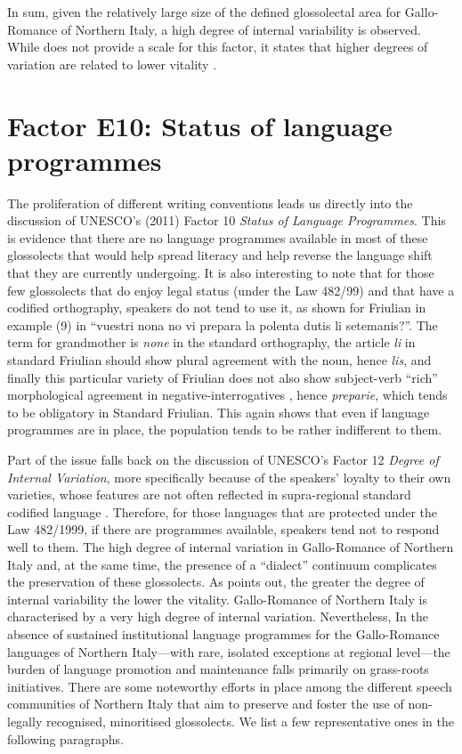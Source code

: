 \documentclass[a4paper,11pt]{article}
\begin{document}
In sum, given the relatively large size of the defined glossolectal area for Gallo-Romance of Northern Italy, a high degree of internal variability is observed. While \citet{unesco2011} does not provide a scale for this factor, it states that higher degrees of variation are related to lower vitality \cite{abtahian2017}.

\section{Factor E10: Status of language programmes}

The proliferation of different writing conventions leads us directly into the discussion of UNESCO’s (2011) Factor 10 \textit{Status of Language Programmes}. This is evidence that there are no language programmes available in most of these glossolects that would help spread literacy and help reverse the language shift that they are currently undergoing. It is also interesting to note that for those few glossolects that do enjoy legal status (under the Law 482/99) and that have a codified orthography, speakers do not tend to use it, as shown for Friulian in example (9) in  ``vuestri nona no vi prepara la polenta dutis li setemanis?''. The term for grandmother is \textit{none} in the standard orthography, the article \textit{li} in standard Friulian should show plural agreement with the noun, hence \textit{lis}, and finally this particular variety of Friulian does not also show subject-verb ``rich'' morphological agreement in negative-interrogatives \citep[see][]{poletto2016subject}, hence \textit{preparie}, which tends to be obligatory in Standard Friulian. This again shows that even if language programmes are in place, the population tends to be rather indifferent to them.

Part of the issue falls back on the discussion of UNESCO’s \citeyearpar{unesco2011} Factor 12 \textit{Degree of Internal Variation}, more specifically because of the speakers’ loyalty to their own varieties, whose features are not often reflected in supra-regional standard codified language \citep[for example][]{lane2017standardizing}. Therefore, for those languages that are protected under the Law 482/1999, if there are programmes available, speakers tend not to respond well to them. The high degree of internal variation in Gallo-Romance of Northern Italy and, at the same time, the presence of a ``dialect'' continuum complicates the preservation of these glossolects. As \citet{unesco2011} points out, the greater the degree of internal variability the lower the vitality. Gallo-Romance of Northern Italy is characterised by a very high degree of internal variation. Nevertheless, In the absence of sustained institutional language programmes for the Gallo-Romance languages of Northern Italy---with rare, isolated exceptions at regional level---the burden of language promotion and maintenance falls primarily on grass-roots initiatives. There are some noteworthy efforts in place among the different speech communities of Northern Italy that aim to preserve and foster the use of non-legally recognised, minoritised glossolects. We list a few representative ones in the following paragraphs.
\end{document}

